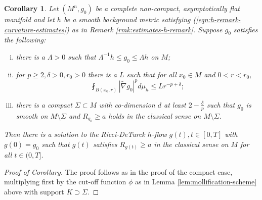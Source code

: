 \documentclass[12pt]{amsart}
\theoremstyle{plain}
\theoremstyle{plain}
\newtheorem{corollary}[subsection]{Corollary}
\theoremstyle{definition}
\theoremstyle{remark}
\numberwithin{equation}{subsection}
\newcommand{\hdel}{\tilde{\nabla}}
\begin{document}
\begin{corollary}\label{thm:non-cpt-dist-scalar-curvature-lower-bdd}
    Let $(M^n, g_0)$ be a complete non-compact, asymptotically flat manifold and let $h$ be a smooth background metric satisfying (\ref{eqn:h-remark-curvature-estimates}) as in Remark \ref{rmk:estimates-h-remark}. Suppose $g_0$ satisfies the following:
    \begin{enumerate}[(i)]
        \item there is a $\Lambda > 0$ such that $\Lambda^{-1}h \leq g_0 \leq \Lambda h$ on $M$;
        \item for $p \geq 2, \delta > 0, r_0 > 0$ there is a $L$ such that for all $x_0 \in M$ and $0 < r < r_0$,
        \begin{equation*}
            \fint_{B(x_0, r)} |\hdel g_0|^p d\mu_h \leq L r^{-p + \delta};
        \end{equation*}
        \item there is a compact $\Sigma \subset M$ with co-dimension $d$ at least $2 - \frac{\delta}{p}$ such that $g_0$ is smooth on $M \setminus \Sigma$ and $R_{g_0} \geq a$ holds in the classical sense on $M \setminus \Sigma$.
    \end{enumerate}
    Then there is a solution to the Ricci-DeTurck $h$-flow $g(t), t\in [0,T]$ with $g(0) = g_0$ such that $g(t)$ satisfies $R_{g(t)} \geq a$ in the classical sense on $M$ for all $t \in (0, T]$.
\end{corollary}

\begin{proof}[Proof of Corollary]
    The proof follows as in the proof of the compact case, multiplying first by the cut-off function $\phi$ as in Lemma \ref{lem:mollification-scheme} above with support $K \supset \Sigma$.
\end{proof}

\newpage

\printbibliography[title=References]
\end{document}
